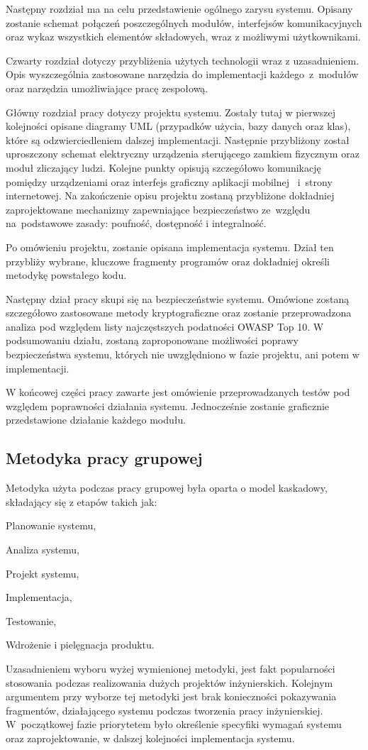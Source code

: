 Następny rozdział ma na celu przedstawienie ogólnego zarysu systemu. Opisany zostanie schemat połączeń poszczególnych modułów, interfejsów komunikacyjnych oraz wykaz wszystkich elementów składowych, wraz z możliwymi użytkownikami.

Czwarty rozdział dotyczy przybliżenia użytych technologii wraz z uzasadnieniem. Opis wyszczególnia zastosowane narzędzia do implementacji każdego~z~modułów oraz narzędzia umożliwiające pracę zespołową.

Główny rozdział pracy dotyczy projektu systemu. Zostały tutaj w pierwszej kolejności opisane diagramy UML (przypadków użycia, bazy danych oraz klas), które są odzwierciedleniem dalszej implementacji. Następnie przybliżony został uproszczony schemat elektryczny urządzenia sterującego zamkiem fizycznym oraz moduł zliczający ludzi. Kolejne punkty opisują szczegółowo komunikację pomiędzy urządzeniami oraz interfejs graficzny aplikacji mobilnej ~i~strony internetowej. Na zakończenie opisu projektu zostaną przybliżone dokładniej zaprojektowane mechanizmy zapewniające bezpieczeństwo ze~względu na~podstawowe zasady: poufność, dostępność i integralność.

Po omówieniu projektu, zostanie opisana implementacja systemu. Dział ten przybliży wybrane, kluczowe fragmenty programów oraz dokładniej określi metodykę powstałego kodu. 

Następny dział pracy skupi się na bezpieczeństwie systemu. Omówione zostaną szczegółowo zastosowane metody kryptograficzne oraz zostanie przeprowadzona analiza pod względem listy najczęstszych podatności OWASP Top 10. W podsumowaniu działu, zostaną zaproponowane możliwości poprawy  bezpieczeństwa systemu, których nie uwzględniono w fazie projektu, ani potem w implementacji.

W końcowej części pracy zawarte jest omówienie przeprowadzanych testów pod względem poprawności działania systemu. Jednocześnie zostanie graficznie przedstawione działanie każdego modułu.

\subsection{Metodyka pracy grupowej}
Metodyka użyta podczas pracy grupowej była oparta o model kaskadowy, składający się z etapów takich jak:
\begin{itemize*}
	\item Planowanie systemu,
	\item Analiza systemu,
	\item Projekt systemu,
	\item Implementacja,
	\item Testowanie,
	\item Wdrożenie i pielęgnacja produktu.
\end{itemize*}

Uzasadnieniem wyboru wyżej wymienionej metodyki, jest fakt popularności stosowania podczas realizowania dużych projektów inżynierskich. Kolejnym argumentem przy wyborze tej metodyki jest brak konieczności pokazywania fragmentów, działającego systemu podczas tworzenia pracy inżynierskiej. W~początkowej fazie priorytetem było określenie specyfiki wymagań systemu oraz zaprojektowanie, w dalszej kolejności implementacja systemu\cite{waterfall}.